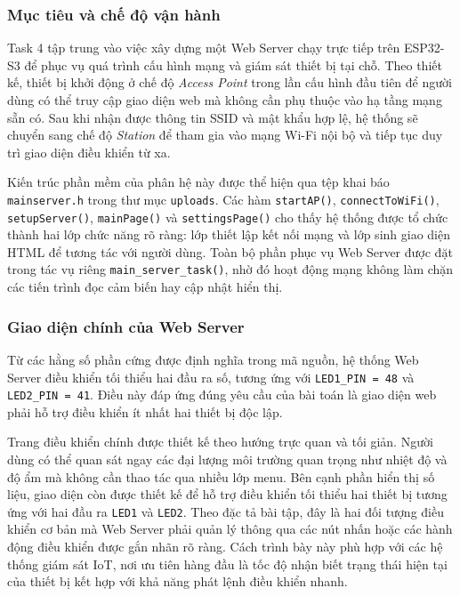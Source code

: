 \subsubsection{Mục tiêu và chế độ vận hành}
Task 4 tập trung vào việc xây dựng một Web Server chạy trực tiếp trên ESP32-S3 để phục vụ quá trình cấu hình mạng và giám sát thiết bị tại chỗ. Theo thiết kế, thiết bị khởi động ở chế độ \textit{Access Point} trong lần cấu hình đầu tiên để người dùng có thể truy cập giao diện web mà không cần phụ thuộc vào hạ tầng mạng sẵn có. Sau khi nhận được thông tin SSID và mật khẩu hợp lệ, hệ thống sẽ chuyển sang chế độ \textit{Station} để tham gia vào mạng Wi-Fi nội bộ và tiếp tục duy trì giao diện điều khiển từ xa.

Kiến trúc phần mềm của phân hệ này được thể hiện qua tệp khai báo \texttt{mainserver.h} trong thư mục \texttt{uploads}. Các hàm \texttt{startAP()}, \texttt{connectToWiFi()}, \texttt{setupServer()}, \texttt{mainPage()} và \texttt{settingsPage()} cho thấy hệ thống được tổ chức thành hai lớp chức năng rõ ràng: lớp thiết lập kết nối mạng và lớp sinh giao diện HTML để tương tác với người dùng. Toàn bộ phần phục vụ Web Server được đặt trong tác vụ riêng \texttt{main\_server\_task()}, nhờ đó hoạt động mạng không làm chặn các tiến trình đọc cảm biến hay cập nhật hiển thị.

\subsubsection{Giao diện chính của Web Server}
Từ các hằng số phần cứng được định nghĩa trong mã nguồn, hệ thống Web Server điều khiển tối thiểu hai đầu ra số, tương ứng với \texttt{LED1\_PIN = 48} và \texttt{LED2\_PIN = 41}. Điều này đáp ứng đúng yêu cầu của bài toán là giao diện web phải hỗ trợ điều khiển ít nhất hai thiết bị độc lập.

Trang điều khiển chính được thiết kế theo hướng trực quan và tối giản. Người dùng có thể quan sát ngay các đại lượng môi trường quan trọng như nhiệt độ và độ ẩm mà không cần thao tác qua nhiều lớp menu. Bên cạnh phần hiển thị số liệu, giao diện còn được thiết kế để hỗ trợ điều khiển tối thiểu hai thiết bị tương ứng với hai đầu ra \texttt{LED1} và \texttt{LED2}. Theo đặc tả bài tập, đây là hai đối tượng điều khiển cơ bản mà Web Server phải quản lý thông qua các nút nhấn hoặc các hành động điều khiển được gắn nhãn rõ ràng. Cách trình bày này phù hợp với các hệ thống giám sát IoT, nơi ưu tiên hàng đầu là tốc độ nhận biết trạng thái hiện tại của thiết bị kết hợp với khả năng phát lệnh điều khiển nhanh.

